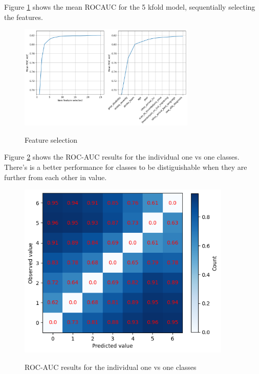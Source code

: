Figure \ref{fig:feature_selection} shows the mean ROCAUC for the 5 kfold model, sequentially selecting the features.

\begin{figure}[!h]
    \centering
    \includegraphics[width=0.75\textwidth]{./images/020_feature_selection.jpg}\\
    \caption{Feature selection}
    \label{fig:feature_selection}
\end{figure}

Figure \ref{fig:confusion_rocauc} shows the ROC-AUC results for the individual one vs one classes. There's is a better performance for classes to be distiguishable when they are further from each other in value. 

\begin{figure}[h!]
    \centering
    {\includegraphics[width = 4in]{./images/040_ROCAUC_confusion_matrix_ovo.png}}\\
    \caption{ROC-AUC results for the individual one vs one classes}
    \label{fig:confusion_rocauc}
\end{figure}

